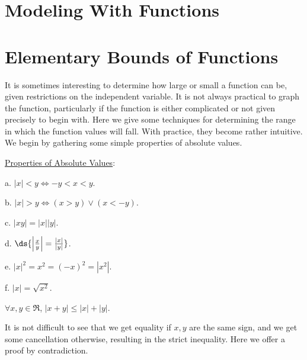 





\newpage
\section{Modeling With Functions}

\section{Elementary Bounds of Functions}
It is sometimes interesting to determine how large or small a function
can be, given restrictions on the independent variable.  It is not
always practical to graph the function, particularly if the function
is either complicated or not given precisely to begin with. Here
we give some techniques for determining the range in which the
function values will fall.  With  practice, they become
rather intuitive.  We begin by gathering some simple  properties
of absolute values.
\bigskip

\noindent\underline{Properties of Absolute Values}:
\begin{description}
\item a. $|x|<y \iff -y<x<y.$
\item b. $|x|>y \iff (x>y)\vee(x<-y)$.
\item c. $|xy|=|x||y|$.
\item d. $\ds{\left|\frac{x}y\right|=\frac{|x|}{|y|}}$. 
\item e. $|x|^2=x^2=(-x)^2=|x^2|$.
\item f. $|x|=\sqrt{x^2}$. 
\end{description}

\begin{proposition} $\forall x,y\in\Re$, $|x+y|\le|x|+|y|$. 
\end{proposition} 

It is not difficult to see that we get equality if $x,y$ are
the same sign, and we get some cancellation otherwise, resulting
in the strict inequality.  Here we offer a proof by contradiction.
\bigskip


